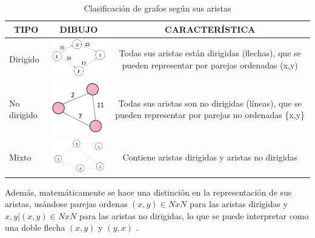 \begin{table}[H]
\caption{Clasificación de grafos según sus aristas}
\centering
\begin{tabular}[c]{lcc}
\multicolumn{1}{c}{\textbf{TIPO}} & \textbf{DIBUJO}                      & \textbf{CARACTERÍSTICA}  \\ \hline
\multicolumn{1}{|l|}{Dirigido}    & \multicolumn{1}{l|}{\includegraphics[align=t, width=36mm]{gafo dirigido.png} } &
\multicolumn{1}{p{6cm}|}{Todas sus aristas están dirigidas (flechas), que se pueden representar por parejas ordenadas (x,y)}     \\ \hline
\multicolumn{1}{|l|}{No dirigido} & \multicolumn{1}{l|}{\includegraphics[align=t,width=36mm]{gafo no dirigido.png}} & \multicolumn{1}{p{6cm}|}{Todas sus aristas son no dirigidas (líneas), que se pueden representar por parejas no ordenadas \{x,y\}} \\ \hline
\multicolumn{1}{|l|}{Mixto}       & \multicolumn{1}{l|}{\includegraphics[align=t,width=36mm]{elementos de un grafo.png}} & \multicolumn{1}{p{6cm}|}{Contiene aristas dirigidas y aristas no dirigidas} \\ \hline
\end{tabular}
\label{dirigido}
\end{table}

Además, matemáticamente se hace una distinción en la representación de sus aristas, usándose parejas ordenas $(x,y) \in NxN$ para las aristas dirigidas y ${x,y} | (x,y) \in NxN$ para las aristas no dirigidas, lo que se puede interpretar como una doble flecha $(x,y)$ y $(y,x)$ \citep{tremblay1996matematica}.

